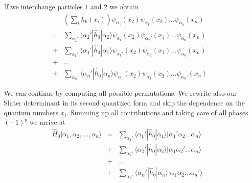 \documentclass[graybox,sectrefs,envcountresetchap,open=right]{svmonodo}
\begin{document}
If we interchange particles $1$ and $2$  we obtain
\begin{eqnarray}
	&& \left( \sum_i \hat{h}_0(x_i) \right) \psi_{\alpha_1}(x_2)\psi_{\alpha_1}(x_2) \dots \psi_{\alpha_n}(x_n) \nonumber \\
	& =&\sum_{\alpha_2'} \langle \alpha_2'|\hat{h}_0|\alpha_2\rangle 
		\psi_{\alpha_1}(x_2)\psi_{\alpha_2'}(x_1) \dots \psi_{\alpha_n}(x_n) \nonumber \\
	&+&\sum_{\alpha_1'} \langle \alpha_1'|\hat{h}_0|\alpha_1\rangle
		\psi_{\alpha_1'}(x_2)\psi_{\alpha_2}(x_1) \dots \psi_{\alpha_n}(x_n) \nonumber \\
	&+& \dots \nonumber \\
	&+&\sum_{\alpha_n'} \langle \alpha_n'|\hat{h}_0|\alpha_n\rangle
		\psi_{\alpha_1}(x_2)\psi_{\alpha_1}(x_2) \dots \psi_{\alpha_n'}(x_n) \label{eq:2-27}
\end{eqnarray}




We can continue by computing all possible permutations. 
We rewrite also our Slater determinant in its second quantized form and skip the dependence on the quantum numbers $x_i.$
Summing up all contributions and taking care of all phases
$(-1)^p$ we arrive at 
\begin{eqnarray}
	\hat{H}_0|\alpha_1,\alpha_2,\dots, \alpha_n\rangle &=& \sum_{\alpha_1'}\langle \alpha_1'|\hat{h}_0|\alpha_1\rangle
		|\alpha_1'\alpha_2 \dots \alpha_{n}\rangle \nonumber \\
	&+& \sum_{\alpha_2'} \langle \alpha_2'|\hat{h}_0|\alpha_2\rangle
		|\alpha_1\alpha_2' \dots \alpha_{n}\rangle \nonumber \\
	&+& \dots \nonumber \\
	&+& \sum_{\alpha_n'} \langle \alpha_n'|\hat{h}_0|\alpha_n\rangle
		|\alpha_1\alpha_2 \dots \alpha_{n}'\rangle \label{eq:2-28}
\end{eqnarray}
\end{document}
